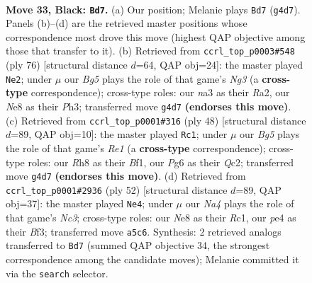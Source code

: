 \documentclass[11pt]{article}
\begin{document}
\clearpage

\begin{figure}[p]\centering
\begin{subfigure}{0.46\textwidth}\centering
\resizebox{\linewidth}{!}{%
\newchessgame
\chessboard[
  setfen={3qn2r/6k1/p4pp1/n1Q1p2p/P3P1b1/N1PP4/B4PPP/R3K1N1 b - - 1 33},
  showmover=false,
  pgfstyle=straightmove, color=movearrow, markmove={g4-d7}
]}
\caption{}
\end{subfigure}\hfill
\begin{subfigure}{0.46\textwidth}\centering
\resizebox{\linewidth}{!}{%
\newchessgame
\chessboard[
  setfen={1r2n1k1/5p2/1q1p2pb/p2Pp3/Q3P2B/2P3NP/R4PPK/8 w - - 3 39},
  showmover=false,
  pgfstyle=straightmove, color=movearrow, markmove={g3-e2}
]}
\caption{}
\end{subfigure}
\\[4pt]
\begin{subfigure}{0.46\textwidth}\centering
\resizebox{\linewidth}{!}{%
\newchessgame
\chessboard[
  setfen={3qnr1k/1p1b3p/3p4/p2Pp3/P3Np2/1P6/2Q2PPP/4RBK1 w - - 1 25},
  showmover=false,
  pgfstyle=straightmove, color=movearrow, markmove={e1-c1}
]}
\caption{}
\end{subfigure}\hfill
\begin{subfigure}{0.46\textwidth}\centering
\resizebox{\linewidth}{!}{%
\newchessgame
\chessboard[
  setfen={3r2k1/5pp1/1p3n1p/q3p3/P1b4P/2N2BP1/1Q2PP2/2R3K1 w - - 0 27},
  showmover=false,
  pgfstyle=straightmove, color=movearrow, markmove={c3-e4}
]}
\caption{}
\end{subfigure}
\caption{\textbf{Move 33, Black: \texttt{Bd7}.} (a) Our position; Melanie plays \texttt{Bd7} (\texttt{g4d7}). Panels (b)--(d) are the retrieved master positions whose correspondence most drove this move (highest QAP objective among those that transfer to it). (b) Retrieved from \texttt{ccrl\_top\_p0003\#548} (ply 76) [structural distance $d$=64, QAP obj=24]: the master played \texttt{Ne2}; under $\mu$ our \emph{Bg5} plays the role of that game's \emph{Ng3} (a \textbf{cross-type} correspondence); cross-type roles: our \emph{n}a3 as their \emph{R}a2, our \emph{N}e8 as their \emph{P}h3; transferred move \texttt{g4d7} \textbf{(endorses this move)}. (c) Retrieved from \texttt{ccrl\_top\_p0001\#316} (ply 48) [structural distance $d$=89, QAP obj=10]: the master played \texttt{Rc1}; under $\mu$ our \emph{Bg5} plays the role of that game's \emph{Re1} (a \textbf{cross-type} correspondence); cross-type roles: our \emph{R}h8 as their \emph{B}f1, our \emph{P}g6 as their \emph{Q}c2; transferred move \texttt{g4d7} \textbf{(endorses this move)}. (d) Retrieved from \texttt{ccrl\_top\_p0001\#2936} (ply 52) [structural distance $d$=89, QAP obj=37]: the master played \texttt{Ne4}; under $\mu$ our \emph{Na4} plays the role of that game's \emph{Nc3}; cross-type roles: our \emph{N}e8 as their \emph{R}c1, our \emph{p}e4 as their \emph{B}f3; transferred move \texttt{a5c6}. Synthesis: 2 retrieved analogs transferred to \texttt{Bd7} (summed QAP objective 34, the strongest correspondence among the candidate moves); Melanie committed it via the \texttt{search} selector.}
\label{fig:thought-m65}
\end{figure}
\end{document}

